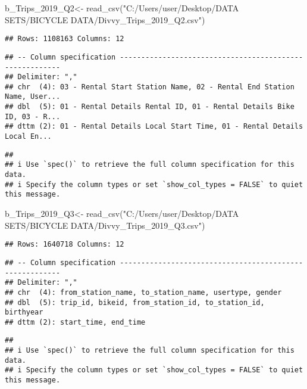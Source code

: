 \documentclass[
]{article}
\newenvironment{Shaded}{\begin{snugshade}}{\end{snugshade}}
\newcommand{\FunctionTok}[1]{\textcolor[rgb]{0.00,0.00,0.00}{#1}}
\newcommand{\NormalTok}[1]{#1}
\newcommand{\OtherTok}[1]{\textcolor[rgb]{0.56,0.35,0.01}{#1}}
\newcommand{\StringTok}[1]{\textcolor[rgb]{0.31,0.60,0.02}{#1}}
\begin{document}
\begin{Shaded}
\begin{Highlighting}[]
\NormalTok{b\_Trips\_2019\_Q2}\OtherTok{\textless{}{-}} \FunctionTok{read\_csv}\NormalTok{(}\StringTok{"C:/Users/user/Desktop/DATA SETS/BICYCLE DATA/Divvy\_Trips\_2019\_Q2.csv"}\NormalTok{)}
\end{Highlighting}
\end{Shaded}

\begin{verbatim}
## Rows: 1108163 Columns: 12
\end{verbatim}

\begin{verbatim}
## -- Column specification --------------------------------------------------------
## Delimiter: ","
## chr  (4): 03 - Rental Start Station Name, 02 - Rental End Station Name, User...
## dbl  (5): 01 - Rental Details Rental ID, 01 - Rental Details Bike ID, 03 - R...
## dttm (2): 01 - Rental Details Local Start Time, 01 - Rental Details Local En...
\end{verbatim}

\begin{verbatim}
## 
## i Use `spec()` to retrieve the full column specification for this data.
## i Specify the column types or set `show_col_types = FALSE` to quiet this message.
\end{verbatim}

\begin{Shaded}
\begin{Highlighting}[]
\NormalTok{b\_Trips\_2019\_Q3}\OtherTok{\textless{}{-}} \FunctionTok{read\_csv}\NormalTok{(}\StringTok{"C:/Users/user/Desktop/DATA SETS/BICYCLE DATA/Divvy\_Trips\_2019\_Q3.csv"}\NormalTok{)}
\end{Highlighting}
\end{Shaded}

\begin{verbatim}
## Rows: 1640718 Columns: 12
\end{verbatim}

\begin{verbatim}
## -- Column specification --------------------------------------------------------
## Delimiter: ","
## chr  (4): from_station_name, to_station_name, usertype, gender
## dbl  (5): trip_id, bikeid, from_station_id, to_station_id, birthyear
## dttm (2): start_time, end_time
\end{verbatim}

\begin{verbatim}
## 
## i Use `spec()` to retrieve the full column specification for this data.
## i Specify the column types or set `show_col_types = FALSE` to quiet this message.
\end{verbatim}
\end{document}
